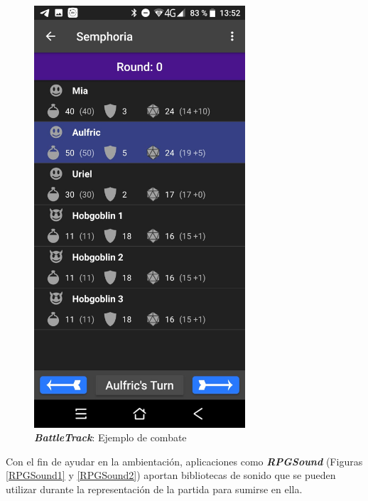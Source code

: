 \begin{figure}[H]
\begin{minipage}{0.3\textwidth}
    \end{minipage} \hspace{2cm}
    \begin{minipage}{0.3\textwidth}
        \centering
        \includegraphics[width=0.7\textwidth]{Images/BattleTrack_2.jpeg}
        \caption{\textit{\textbf{BattleTrack}}: Ejemplo de combate}
        \label{BattleTrack2}           
    \end{minipage}
\end{figure}
Con el fin de ayudar en la ambientación, aplicaciones como 
\textit{\textbf{RPGSound}} (Figuras \ref*{RPGSound1} y \ref*{RPGSound2}) 
aportan bibliotecas de sonido que se pueden 
utilizar durante la representación de la partida para sumirse en ella.
\newpage

